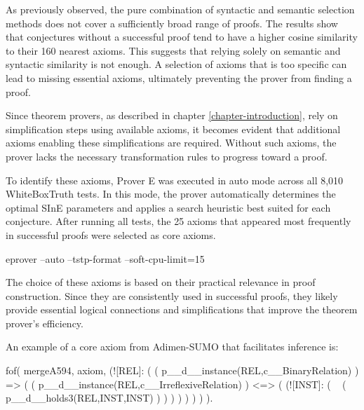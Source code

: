 \documentclass[english,version-2020-11]{uzl-thesis}
\begin{document}
As previously observed, the pure combination of syntactic and semantic selection methods does not cover a sufficiently broad range of proofs. The results show that conjectures without a successful proof tend to have a higher cosine similarity to their 160 nearest axioms. This suggests that relying solely on semantic and syntactic similarity is not enough. A selection of axioms that is too specific can lead to missing essential axioms, ultimately preventing the prover from finding a proof.

Since theorem provers, as described in chapter \ref{chapter-introduction}, rely on simplification steps using available axioms, it becomes evident that additional axioms enabling these simplifications are required. Without such axioms, the prover lacks the necessary transformation rules to progress toward a proof.

To identify these axioms, Prover E was executed in auto mode across all 8,010 WhiteBoxTruth tests. In this mode, the prover automatically determines the optimal SInE parameters and applies a search heuristic best suited for each conjecture. After running all tests, the 25 axioms that appeared most frequently in successful proofs were selected as core axioms.

\begin{Pseudocode}[morekeywords = {add, create}, deletekeywords={to}, numbers=left,
    caption = {Prover E configuration}]
    eprover --auto --tstp-format --soft-cpu-limit=15
\end{Pseudocode}


The choice of these axioms is based on their practical relevance in proof construction. Since they are consistently used in successful proofs, they likely provide essential logical connections and simplifications that improve the theorem prover's efficiency.

An example of a core axiom from Adimen-SUMO that facilitates inference is:


\begin{Pseudocode}[morekeywords = {add, create}, deletekeywords={to}, numbers=left, caption = {Example core axiom}]
    fof( mergeA594, axiom,
        (![REL]: 
            (
                (
                    p__d__instance(REL,c__BinaryRelation)
                )
                =>
                (
                    (
                        p__d__instance(REL,c__IrreflexiveRelation)
                    )
                    <=>
                    (
                        (![INST]: 
                            (
                                ~ (
                                    p__d__holds3(REL,INST,INST)
                                )
                            )
                        )
                    )
                )
            )
        )
    ).
\end{Pseudocode}
\end{document}
